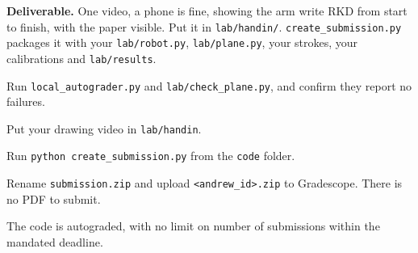 \documentclass{16384_doc}
\begin{document}
\begin{questions}
\begin{enumerate}[label=\alph*.]
        \textbf{Deliverable.}  One video, a phone is fine, showing the arm write
        RKD from start to finish, with the paper visible.  Put it in
        \verb!lab/handin/!.  \verb!create_submission.py! packages it with your
        \verb!lab/robot.py!, \verb!lab/plane.py!, your strokes, your
        calibrations and \verb!lab/results!.
    \end{enumerate}
\end{questions}

\begin{submissionChecklist}
        \item Run \verb!local_autograder.py! and \verb!lab/check_plane.py!, and confirm they report no failures.
        \item Put your drawing video in \verb!lab/handin!.
        \item Run \verb!python create_submission.py! from the \verb!code! folder.
        \item Rename \verb|submission.zip| and upload \verb!<andrew_id>.zip! to Gradescope.  There is no PDF to submit.
        \item The code is autograded, with no limit on number of submissions within the mandated deadline.
\end{submissionChecklist}
\end{document}
